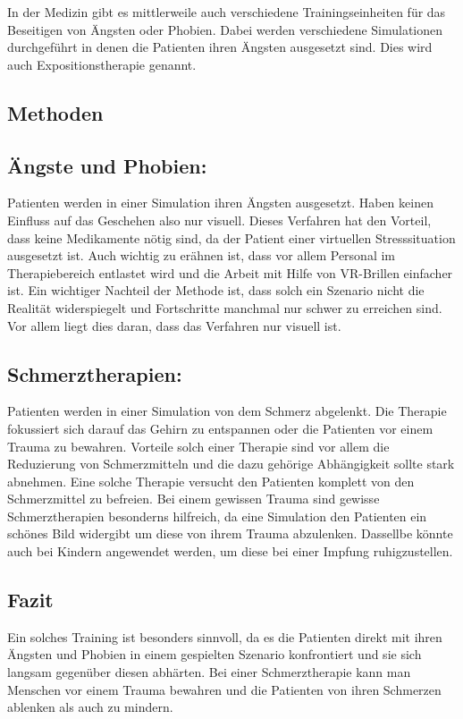 
In der Medizin gibt es mittlerweile auch verschiedene Trainingseinheiten für das Beseitigen von Ängsten oder Phobien. Dabei werden verschiedene Simulationen durchgeführt in denen die Patienten ihren Ängsten ausgesetzt sind. Dies wird auch Expositionstherapie genannt.\\

\subsection{Methoden}
\subsection{Ängste und Phobien:}
Patienten werden in einer Simulation ihren Ängsten ausgesetzt. Haben keinen Einfluss auf das Geschehen also nur visuell. Dieses Verfahren hat den Vorteil, dass keine Medikamente nötig sind, da der Patient einer virtuellen Stresssituation ausgesetzt ist. Auch wichtig zu erähnen ist, dass vor allem Personal im Therapiebereich entlastet wird und die Arbeit mit Hilfe von VR-Brillen einfacher ist. Ein wichtiger Nachteil der Methode ist, dass solch ein Szenario nicht die Realität widerspiegelt und Fortschritte manchmal nur schwer zu erreichen sind. Vor allem liegt dies daran, dass das Verfahren nur visuell ist.\\

\subsection{Schmerztherapien:}
Patienten werden in einer Simulation von dem Schmerz abgelenkt. Die Therapie fokussiert sich darauf das Gehirn zu entspannen oder die Patienten vor einem Trauma zu bewahren. Vorteile solch einer Therapie sind vor allem die Reduzierung von Schmerzmitteln und die dazu gehörige Abhängigkeit sollte stark abnehmen. Eine solche Therapie versucht den Patienten komplett von den Schmerzmittel zu befreien. Bei einem gewissen Trauma sind gewisse Schmerztherapien besonderns hilfreich, da eine Simulation den Patienten ein schönes Bild widergibt um diese von ihrem Trauma abzulenken. Dassellbe könnte auch bei Kindern angewendet werden, um diese bei einer Impfung ruhigzustellen.\\

\subsection{Fazit}
Ein solches Training ist besonders sinnvoll, da es die Patienten direkt mit ihren Ängsten und Phobien in einem gespielten Szenario konfrontiert und sie sich langsam gegenüber diesen abhärten. Bei einer Schmerztherapie kann man Menschen vor einem Trauma bewahren und die Patienten von ihren Schmerzen ablenken als auch zu mindern. 






